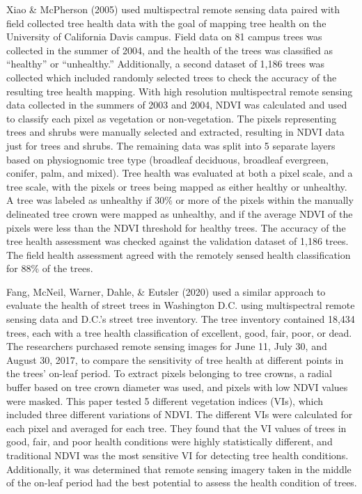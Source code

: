 \documentclass[12pt,twoside]{reedthesis}
\begin{document}
Xiao \& McPherson (2005) used multispectral remote sensing data paired with field collected tree health data with the goal of mapping tree health on the University of California Davis campus. Field data on 81 campus trees was collected in the summer of 2004, and the health of the trees was classified as ``healthy'' or ``unhealthy.'' Additionally, a second dataset of 1,186 trees was collected which included randomly selected trees to check the accuracy of the resulting tree health mapping. With high resolution multispectral remote sensing data collected in the summers of 2003 and 2004, NDVI was calculated and used to classify each pixel as vegetation or non-vegetation. The pixels representing trees and shrubs were manually selected and extracted, resulting in NDVI data just for trees and shrubs. The remaining data was split into 5 separate layers based on physiognomic tree type (broadleaf deciduous, broadleaf evergreen, conifer, palm, and mixed). Tree health was evaluated at both a pixel scale, and a tree scale, with the pixels or trees being mapped as either healthy or unhealthy. A tree was labeled as unhealthy if 30\% or more of the pixels within the manually delineated tree crown were mapped as unhealthy, and if the average NDVI of the pixels were less than the NDVI threshold for healthy trees. The accuracy of the tree health assessment was checked against the validation dataset of 1,186 trees. The field health assessment agreed with the remotely sensed health classification for 88\% of the trees.

Fang, McNeil, Warner, Dahle, \& Eutsler (2020) used a similar approach to evaluate the health of street trees in Washington D.C. using multispectral remote sensing data and D.C.'s street tree inventory. The tree inventory contained 18,434 trees, each with a tree health classification of excellent, good, fair, poor, or dead. The researchers purchased remote sensing images for June 11, July 30, and August 30, 2017, to compare the sensitivity of tree health at different points in the trees' on-leaf period. To extract pixels belonging to tree crowns, a radial buffer based on tree crown diameter was used, and pixels with low NDVI values were masked. This paper tested 5 different vegetation indices (VIs), which included three different variations of NDVI. The different VIs were calculated for each pixel and averaged for each tree. They found that the VI values of trees in good, fair, and poor health conditions were highly statistically different, and traditional NDVI was the most sensitive VI for detecting tree health conditions. Additionally, it was determined that remote sensing imagery taken in the middle of the on-leaf period had the best potential to assess the health condition of trees.
\end{document}
